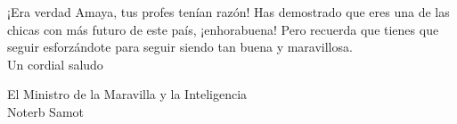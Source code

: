 \documentclass[svgnames,addpoints]{exam}
\begin{document}
\vspace*{1.6cm}

\begin{center}
  
    \begin{minipage}{13cm}

    ¡Era verdad Amaya, tus profes tenían razón! Has demostrado que eres una de las chicas con más futuro de este país, ¡enhorabuena! Pero recuerda que tienes que seguir esforzándote para seguir siendo tan buena y maravillosa.\\ 

    Un cordial saludo

    \vspace*{1.5cm}

    El Ministro de la  Maravilla y la Inteligencia\\
    Noterb Samot

    \end{minipage}
\end{center}
\end{document}
